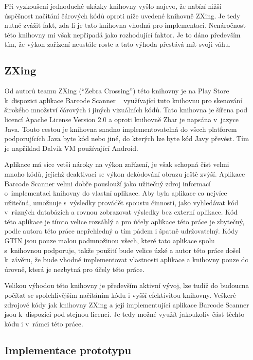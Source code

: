 \documentclass[thesis=B,czech]{FITthesis}[2013/10/20]
\begin{document}
Při vyzkoušení jednoduché ukázky knihovny vyšlo najevo, že nabízí nižší úspěšnost načítání čárových kódů oproti níže uvedené knihovně ZXing. Je tedy nutné zvážit fakt, zda-li je tato knihovna vhodná pro implementaci. Nenáročnost této knihovny mi však nepřipadá jako rozhodující faktor. Je to dáno především tím, že výkon zařízení neustále roste a tato výhoda přestává mít svoji váhu.

\subsection{ZXing ~\cite{zxing}}

Od autorů teamu ZXing (``Zebra Crossing'') této knihovny je na Play Store k~dispozici aplikace Barcode Scanner ~\cite{barcode_scanner} využívající tuto knihovnu pro skenování širokého množství čárových i jiných vizuálních kódů. Tato knihovna je šířena pod licencí Apache License Version 2.0 a oproti knihovně Zbar je napsána v~jazyce Java. Touto cestou je knihovna snadno implementovatelná do všech platforem podporujících Java byte kód nebo jiné, do kterých lze byte kód Javy převést. Tím je například Dalvik VM používající Android.

Aplikace má sice vetší nároky na výkon zařízení, je však schopná číst velmi mnoho kódů, jejichž deaktivací se výkon dekódování obrazu ještě zvýší. Aplikace Barcode Scanner velmi dobře pouslouží jako užitečný zdroj informací o~implementaci knihovny do vlastní aplikace. Aby byla aplikace co nejvíce užitečná, umožnuje s~výsledky provádět spoustu činností, jako vyhledávat kód v~různých databázích a rovnou zobrazovat výsledky bez externí aplikace. Kód této aplikace je tímto velice rozsáhlý a pro účely aplikace této práce je zbytečný, podle autora této práce nepřehledný a tím pádem i špatně udržovatelný. Kódy GTIN jsou pouze malou podmnožinou všech, které tato aplikace spolu s~knihovnou podporuje, takže použití bude velice úzké a autor této práce došel k~závěru, že bude vhodné implementovat vlastnosti aplikace a knihovny pouze do úrovně, která je nezbytná pro účely této práce.

Velikou výhodou této knihovny je především aktivní vývoj, lze tudíž do budoucna počítat se spolehlivějším načítáním kódu i vyšší efektivitou knihovny. Veškeré zdrojové kódy jak knihovny ZXing a její implementující aplikace Barcode Scanner jsou k~dispozici pod stejnou licencí. Je tedy možné využít jakoukoliv část těchto kódu i v~rámci této práce. 

\subsection{Implementace prototypu}
\end{document}
